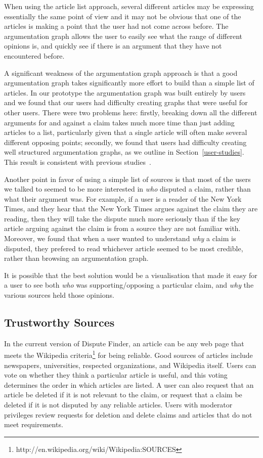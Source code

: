 \documentclass{www2010-submission}
\newcommand{\todo}[1]{}
\begin{document}
\todo{Call them supporting pages? Naming is a mess right now.}

When using the article list approach, several different articles may be expressing essentially the same point of view and it may not be obvious that one of the articles is making a point that the user had not come across before. The argumentation graph allows the user to easily see what the range of different opinions is, and quickly see if there is an argument that they have not encountered before. 

A significant weakness of the argumentation graph approach is that a good argumentation graph takes significantly more effort to build than a simple list of articles. In our prototype the argumentation graph was built entirely by users and we found that our users had difficulty creating graphs that were useful for other users. There were two problems here: firstly, breaking down all the different arguments for and against a claim takes much more time than just adding articles to a list, particularly given that a single article will often make several different opposing points; secondly, we found that users had difficulty creating well structured argumentation graphs, as we outline in Section~\ref{user-studies}. This result is consistent with previous studies~\cite{Isenmann1997}.

Another point in favor of using a simple list of sources is that most of the users we talked to seemed to be more interested in {\it who} disputed a claim, rather than what their argument was. For example, if a user is a reader of the New York Times, and they hear that the New York Times argues against the claim they are reading, then they will take the dispute much more seriously than if the key article arguing against the claim is from a source they are not familiar with. Moreover, we found that when a user wanted to understand {\it why} a claim is disputed, they prefered to read whichever article seemed to be most credible, rather than browsing an argumentation graph.

It is possible that the best solution would be a visualisation that made it easy for a user to see both {\it who} was supporting/opposing a particular claim, and {\it why} the various sources held those opinions.


\subsection{Trustworthy Sources}

In the current version of Dispute Finder, an article can be any web page that meets the Wikipedia criteria\footnote{http://en.wikipedia.org/wiki/Wikipedia:SOURCES} for being reliable. Good sources of articles include newspapers, universities, respected organizations, and Wikipedia itself. Users can vote on whether they think a particular article is useful, and this voting determines the order in which articles are listed. A user can also request that an article be deleted if it is not relevant to the claim, or request that a claim be deleted if it is not disputed by any reliable articles. Users with moderator privileges review requests for deletion and delete claims and articles that do not meet requirements.
\end{document}
